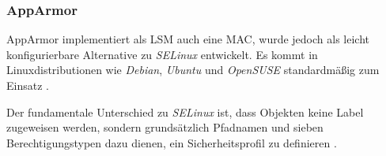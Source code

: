\documentclass[../main.tex]{subfiles}
\begin{document}



      \subsubsection{AppArmor}
				AppArmor implementiert als LSM auch eine MAC, wurde jedoch als leicht konfigurierbare Alternative zu \emph{SELinux} entwickelt. Es kommt in Linuxdistributionen wie \emph{Debian}, \emph{Ubuntu} und \emph{OpenSUSE} standardmäßig zum Einsatz \cite{apparmorUbuntu}.



				Der fundamentale Unterschied zu \emph{SELinux} ist, dass Objekten keine Label zugeweisen werden, sondern grundsätzlich Pfadnamen und sieben Berechtigungstypen dazu dienen, ein Sicherheitsprofil zu definieren \cite{linuxSecOverview}\cite{apparmorQuickProfileLanguage}.

\end{document}
